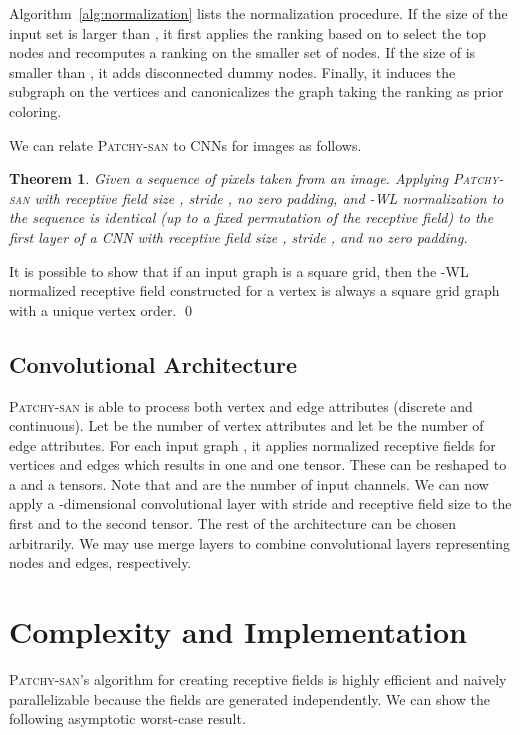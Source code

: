 \documentclass{article}
\newtheorem{thmx}{Theorem}
\renewenvironment{proof}{{\bf Proof:}}{\qed}
\newcommand{\patchysan}{{\textsc{Patchy-san}}\xspace}
\begin{document}
Algorithm~\ref{alg:normalization} lists the normalization procedure. If the size of the input set  is larger than , it first applies the ranking based on  to select the top  nodes and recomputes a ranking on the smaller set of nodes. If the size of  is smaller than , it adds disconnected dummy nodes. Finally, it induces the subgraph on the vertices  and canonicalizes the graph taking the ranking  as prior coloring.

We can relate \textsc{Patchy-san} to CNNs for images as follows. 
\begin{thmx}
Given a sequence of pixels taken from an image. Applying \textsc{Patchy-san} with receptive field size , stride , no zero padding, and -WL normalization to the sequence is identical (up to a fixed permutation of the receptive field) to the first layer of a \textsc{CNN} with receptive field size , stride , and no zero padding.  
\end{thmx}

\begin{proof}
It is possible to show that if an input graph is a square grid, then the -WL normalized receptive field constructed for a vertex is always a square grid graph with a unique vertex order. 
\end{proof}

\subsection{Convolutional Architecture}

\patchysan is able to process both vertex and edge attributes (discrete and continuous). Let  be the number of vertex attributes and let  be the number of edge attributes. For each input graph , it applies normalized receptive fields for vertices and edges which results in one  and one  tensor. These can be reshaped to a  and a  tensors. Note that  and  are the number of input channels. We can now apply a -dimensional convolutional layer with stride and receptive field size  to the first and  to the second tensor. The rest of the architecture can be chosen arbitrarily. We may use merge layers to combine convolutional layers representing nodes and edges, respectively.


\section{Complexity and Implementation}
\patchysan's algorithm for creating receptive fields is highly efficient and  naively parallelizable because the fields are generated independently. We can show the following asymptotic worst-case result.
\end{document}

